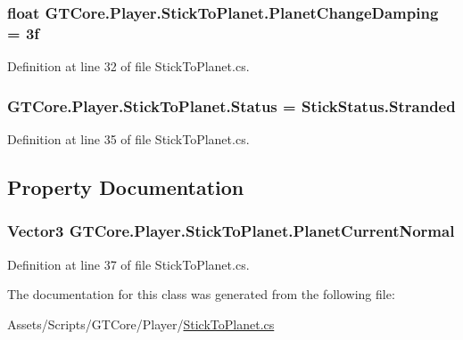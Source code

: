 \subsubsection[{Planet\+Change\+Damping}]{\setlength{\rightskip}{0pt plus 5cm}float G\+T\+Core.\+Player.\+Stick\+To\+Planet.\+Planet\+Change\+Damping = 3f}\label{class_g_t_core_1_1_player_1_1_stick_to_planet_a5ccaddd5d4bdc14fc1c289fca645c470}


Definition at line 32 of file Stick\+To\+Planet.\+cs.

\hypertarget{class_g_t_core_1_1_player_1_1_stick_to_planet_a7fb03985d99e5effac6072d51c59811e}{}
\subsubsection[{Status}]{ G\+T\+Core.\+Player.\+Stick\+To\+Planet.\+Status = {\bf Stick\+Status.\+Stranded}}\label{class_g_t_core_1_1_player_1_1_stick_to_planet_a7fb03985d99e5effac6072d51c59811e}


Definition at line 35 of file Stick\+To\+Planet.\+cs.



\subsection{Property Documentation}
\hypertarget{class_g_t_core_1_1_player_1_1_stick_to_planet_a2987fbd9ccbaba54cc7fa12b2d2d858e}{}
\subsubsection[{Planet\+Current\+Normal}]{\setlength{\rightskip}{0pt plus 5cm}Vector3 G\+T\+Core.\+Player.\+Stick\+To\+Planet.\+Planet\+Current\+Normal\hspace{0.3cm}{\ttfamily [get]}}\label{class_g_t_core_1_1_player_1_1_stick_to_planet_a2987fbd9ccbaba54cc7fa12b2d2d858e}


Definition at line 37 of file Stick\+To\+Planet.\+cs.



The documentation for this class was generated from the following file\+:\begin{DoxyCompactItemize}
\item 
Assets/\+Scripts/\+G\+T\+Core/\+Player/\hyperlink{_stick_to_planet_8cs}{Stick\+To\+Planet.\+cs}\end{DoxyCompactItemize}
